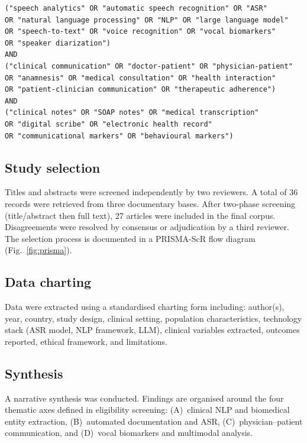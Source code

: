 \documentclass[a4paper,fleqn]{cas-sc}
\begin{document}
\begin{verbatim}
("speech analytics" OR "automatic speech recognition" OR "ASR"
OR "natural language processing" OR "NLP" OR "large language model"
OR "speech-to-text" OR "voice recognition" OR "vocal biomarkers"
OR "speaker diarization")
AND
("clinical communication" OR "doctor-patient" OR "physician-patient"
OR "anamnesis" OR "medical consultation" OR "health interaction"
OR "patient-clinician communication" OR "therapeutic adherence")
AND
("clinical notes" OR "SOAP notes" OR "medical transcription"
OR "digital scribe" OR "electronic health record"
OR "communicational markers" OR "behavioural markers")
\end{verbatim}

\subsection{Study selection}

Titles and abstracts were screened independently by two reviewers. A total
of 36 records were retrieved from three documentary bases. After two-phase
screening (title/abstract then full text), 27 articles were included in the
final corpus. Disagreements were resolved by consensus or adjudication by a
third reviewer. The selection process is documented in a PRISMA-ScR flow
diagram (Fig.~\ref{fig:prisma}).

\subsection{Data charting}

Data were extracted using a standardised charting form including: author(s),
year, country, study design, clinical setting, population characteristics,
technology stack (ASR model, NLP framework, LLM), clinical variables
extracted, outcomes reported, ethical framework, and limitations.

\subsection{Synthesis}

A narrative synthesis was conducted. Findings are organised around the
four thematic axes defined in eligibility screening: (A)~clinical NLP
and biomedical entity extraction, (B)~automated documentation and ASR,
(C)~physician–patient communication, and (D)~vocal biomarkers and
multimodal analysis.

\end{document}
